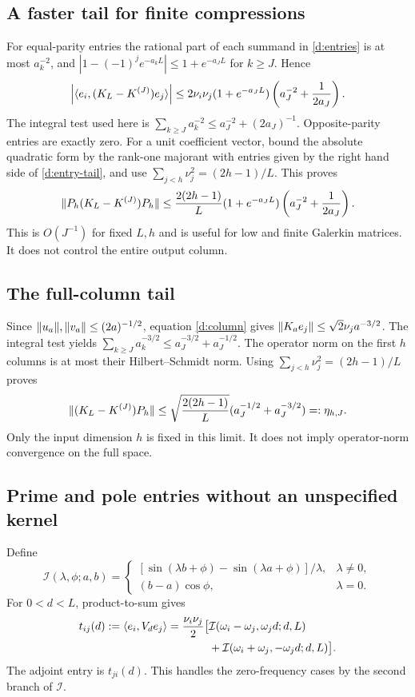 \subsection{A faster tail for finite compressions}
For equal-parity entries the rational part of each summand in
\eqref{d:entries} is at most $a_k^{-2}$, and
$|1-(-1)^je^{-a_kL}|\le1+e^{-a_JL}$ for $k\ge J$. Hence
\begin{equation}\label{d:entry-tail}
\left|\langle e_i,(K_L-K^{(J)})e_j\rangle\right|
\le2\nu_i\nu_j(1+e^{-a_JL})
\left(a_J^{-2}+\frac1{2a_J}\right).
\end{equation}
The integral test used here is
$\sum_{k\ge J}a_k^{-2}\le a_J^{-2}+(2a_J)^{-1}$.
Opposite-parity entries are exactly zero. For a unit coefficient vector,
bound the absolute quadratic form by the rank-one majorant with entries
given by the right hand side of \eqref{d:entry-tail}, and use
$\sum_{j<h}\nu_j^2=(2h-1)/L$. This proves
\begin{equation}\label{d:compression-tail}
\lVert P_h(K_L-K^{(J)})P_h\rVert
\le\frac{2(2h-1)}L(1+e^{-a_JL})
\left(a_J^{-2}+\frac1{2a_J}\right).
\end{equation}
This is $O(J^{-1})$ for fixed $L,h$ and is useful for low and finite
Galerkin matrices. It does not control the entire output column.

\subsection{The full-column tail}
Since $\lVert u_a\rVert,\lVert v_a\rVert\le(2a)^{-1/2}$, equation \eqref{d:column}
gives $\lVert K_ae_j\rVert\le\sqrt2\nu_ja^{-3/2}$.
The integral test yields
$\sum_{k\ge J}a_k^{-3/2}\le a_J^{-3/2}+a_J^{-1/2}$.
The operator norm on the first $h$ columns is at most their Hilbert--Schmidt
norm. Using $\sum_{j<h}\nu_j^2=(2h-1)/L$ proves
\begin{equation}\label{d:column-tail}
\lVert (K_L-K^{(J)})P_h\rVert\le
\sqrt{\frac{2(2h-1)}L}(a_J^{-1/2}+a_J^{-3/2})=:\eta_{h,J}.
\end{equation}
Only the input dimension $h$ is fixed in this limit. It does not imply
operator-norm convergence on the full space.

\subsection{Prime and pole entries without an unspecified kernel}
Define
\[
\mathcal I(\lambda,\phi;a,b)=
\begin{cases}
[\sin(\lambda b+\phi)-\sin(\lambda a+\phi)]/\lambda,&\lambda\ne0,\\
(b-a)\cos\phi,&\lambda=0.
\end{cases}
\]
For $0<d<L$, product-to-sum gives
\begin{align}
t_{ij}(d):=\langle e_i,V_de_j\rangle
=\frac{\nu_i\nu_j}{2}\bigl[&\mathcal I(\omega_i-\omega_j,\omega_jd;d,L)\notag\\
&+\mathcal I(\omega_i+\omega_j,-\omega_jd;d,L)\bigr].
\label{d:shift-entries}
\end{align}
The adjoint entry is $t_{ji}(d)$. This handles the zero-frequency cases
by the second branch of $\mathcal I$.

